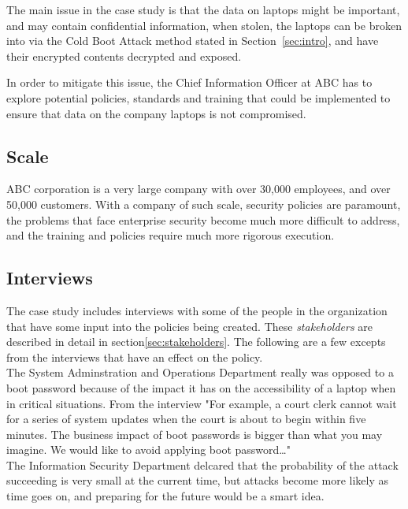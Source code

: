 \documentclass[paper=a4, fontsize=11pt]{scrartcl} %
\numberwithin{equation}{section} %
\numberwithin{figure}{section} %
\numberwithin{table}{section} %
\begin{document}
The main issue in the case study is that the data on laptops might be important, and may contain confidential information, when stolen, the laptops can be broken into via the Cold Boot Attack method stated in Section~\ref{sec:intro}, and have their encrypted contents decrypted and exposed. 

In order to mitigate this issue, the Chief Information Officer at ABC has to explore potential policies, standards and training that could be implemented to ensure that data on the company laptops is not compromised. \\

\subsection{Scale}
ABC corporation is a very large company with over 30,000 employees, and over 50,000 customers.  With a company of such scale, security policies are paramount, the problems that face enterprise security become much more difficult to address, and the training and policies require much more rigorous execution.\\

\subsection{Interviews}
\label{sec:interviews}
The case study includes interviews with some of the people in the organization that have some input into the policies being created.  These \emph{stakeholders} are described in detail in section\ref{sec:stakeholders}.  The following are a few excepts from the interviews that have an effect on the policy.\\

The System Adminstration and Operations Department really was opposed to a boot password because of the impact it has on the accessibility of a laptop when in critical situations.  From the interview "For example, a court clerk cannot wait for a series of system updates when the court is about to begin within five minutes. The business impact of boot passwords is bigger than what you may imagine. We would like to avoid applying boot password…" \\ 

The Information Security Department delcared that the probability of the attack succeeding is very small at the current time,  but attacks become more likely as time goes on, and preparing for the future would be a smart idea.\\
 
\end{document}
